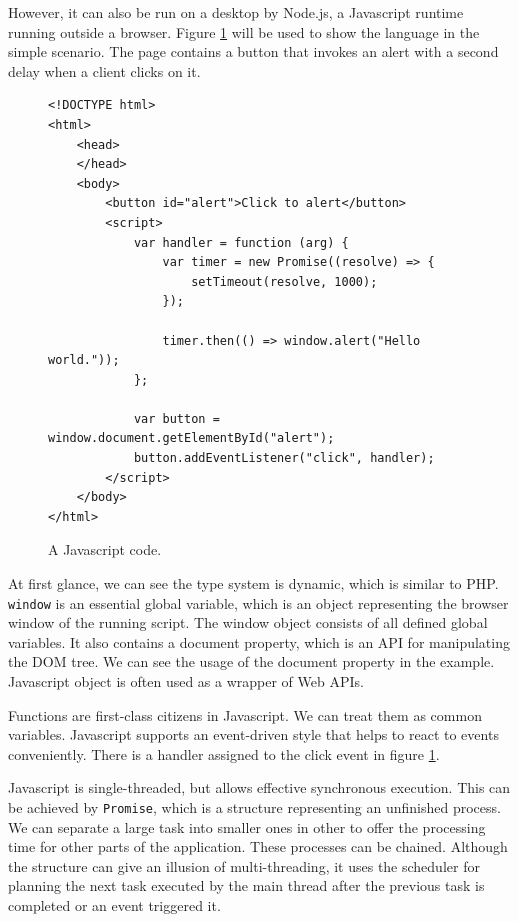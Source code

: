 However, it can also be run on a desktop by Node.js, a Javascript runtime running outside a browser.
Figure \ref{img02:javascript} will be used to show the language in the simple scenario.
The page contains a button that invokes an alert with a second delay when a client clicks on it.
\par
\begin{figure}
\begin{lstlisting}
<!DOCTYPE html>
<html>
    <head>
    </head>
    <body>
        <button id="alert">Click to alert</button>
        <script>
            var handler = function (arg) {
                var timer = new Promise((resolve) => {
                    setTimeout(resolve, 1000);
                }); 
        
                timer.then(() => window.alert("Hello world."));
            };  

            var button = window.document.getElementById("alert");
            button.addEventListener("click", handler);
        </script>
    </body>
</html>
\end{lstlisting}
\caption{A Javascript code.}
\label{img02:javascript}
\end{figure}
\par
At first glance, we can see the type system is dynamic, which is similar to PHP.
\texttt{window} is an essential global variable, which is an object representing the browser window of the running script.
The window object consists of all defined global variables.
It also contains a document property, which is an API for manipulating the DOM tree.
We can see the usage of the document property in the example.
Javascript object is often used as a wrapper of Web APIs.
\par
Functions are first-class citizens in Javascript.
We can treat them as common variables.
Javascript supports an event-driven style that helps to react to events conveniently.
There is a handler assigned to the click event in figure \ref{img02:javascript}.
\par
{}
Javascript is single-threaded, but allows effective synchronous execution.
This can be achieved by \texttt{Promise}, which is a structure representing an unfinished process.
We can separate a large task into smaller ones in other to offer the processing time for other parts of the application.
These processes can be chained.
Although the structure can give an illusion of multi-threading, it uses the scheduler for planning the next task executed by the main thread after the previous task is completed or an event triggered it.
